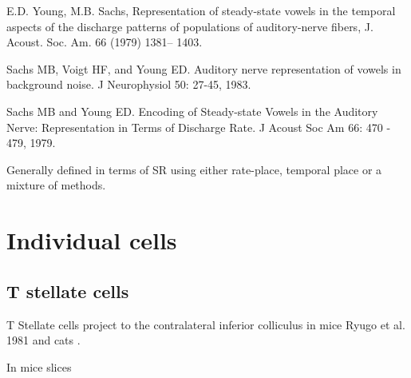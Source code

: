 \documentclass[10pt,a4paper]{article}
\begin{document}
E.D. Young, M.B. Sachs, Representation of steady-state vowels
in the temporal aspects of the discharge patterns of populations
of auditory-nerve fibers, J. Acoust. Soc. Am. 66 (1979) 1381--
1403.

Sachs MB, Voigt HF, and Young ED. Auditory nerve representation of vowels in
background noise. J Neurophysiol 50: 27-45, 1983.

Sachs MB and Young ED. Encoding of Steady-state Vowels in the Auditory Nerve:
Representation in Terms of Discharge Rate. J Acoust Soc Am 66: 470 - 479, 1979.

Generally defined in terms of SR using either rate-place, temporal place or a
mixture of methods.

\section{Individual cells}
\subsection[T stellate cells]{T stellate cells}

T Stellate cells project to the contralateral inferior colliculus in mice
\citep{OertelWuEtAl:1990,RoullierRyugo:1984} Ryugo et al. 1981 and
cats \citep{Adams:1979,Adams:1983,Cant:1982,Oliver:1987,Osen:1972,RothAitkinEtAl:1978}.

In mice slices \citep{FerragamoGoldingEtAl:1998a}
\end{document}
